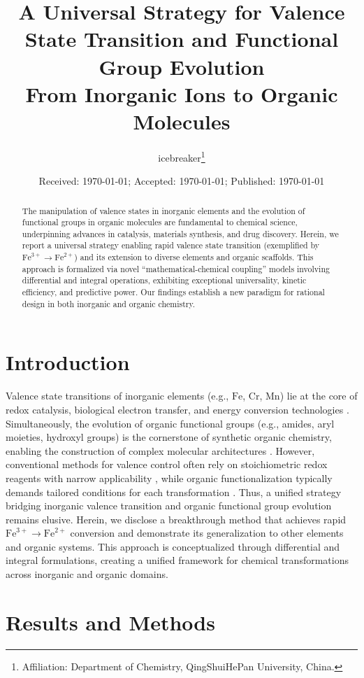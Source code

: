 \documentclass[twocolumn,11pt]{article}
\title{A Universal Strategy for Valence State Transition and Functional Group Evolution\\From Inorganic Ions to Organic Molecules}
\author{icebreaker\thanks{Affiliation: Department of Chemistry, QingShuiHePan University, China.}}
\date{Received: \today; Accepted: \today; Published: \today}
\begin{document}
\maketitle

\begin{abstract}
The manipulation of valence states in inorganic elements and the evolution of functional groups in organic molecules are fundamental to chemical science, underpinning advances in catalysis, materials synthesis, and drug discovery. Herein, we report a universal strategy enabling rapid valence state transition (exemplified by \(\text{Fe}^{3+} \to \text{Fe}^{2+}\)) and its extension to diverse elements and organic scaffolds. This approach is formalized via novel ``mathematical-chemical coupling'' models involving differential and integral operations, exhibiting exceptional universality, kinetic efficiency, and predictive power. Our findings establish a new paradigm for rational design in both inorganic and organic chemistry.
\end{abstract}

\section{Introduction}
Valence state transitions of inorganic elements (e.g., \(\text{Fe}\), \(\text{Cr}\), \(\text{Mn}\)) lie at the core of redox catalysis, biological electron transfer, and energy conversion technologies \cite{noble2020redox, liu2022inorganic}. Simultaneously, the evolution of organic functional groups (e.g., amides, aryl moieties, hydroxyl groups) is the cornerstone of synthetic organic chemistry, enabling the construction of complex molecular architectures \cite{smith2021synthetic, zhang2023organic}. However, conventional methods for valence control often rely on stoichiometric redox reagents with narrow applicability \cite{brown2019redox}, while organic functionalization typically demands tailored conditions for each transformation \cite{lee2020functional}. Thus, a unified strategy bridging inorganic valence transition and organic functional group evolution remains elusive.
Herein, we disclose a breakthrough method that achieves rapid \(\text{Fe}^{3+} \to \text{Fe}^{2+}\) conversion and demonstrate its generalization to other elements and organic systems. This approach is conceptualized through differential and integral formulations, creating a unified framework for chemical transformations across inorganic and organic domains.

\section{Results and Methods}
\end{document}
